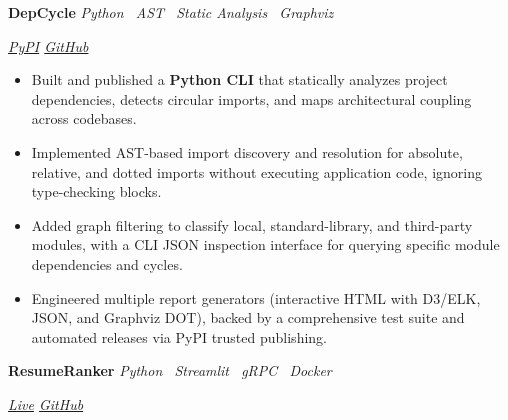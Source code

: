 \documentclass[10pt,a4paper]{article}
\newcommand{\projectentry}[3]{%
    \noindent
    \begin{minipage}[t]{0.66\linewidth}
        \raggedright
        \textbf{#1}
        \hspace{0.7em}
        \textit{\color{textgray}#2}
    \end{minipage}%
    \hfill
    \begin{minipage}[t]{0.30\linewidth}
        \raggedleft
        \itshape\color{textgray}#3
    \end{minipage}%
    \par
}
\begin{document}
\vspace{2pt}

\projectentry
    {DepCycle}
    {Python \textperiodcentered\ AST \textperiodcentered\ Static Analysis \textperiodcentered\ Graphviz}
    {\href{https://pypi.org/project/depcycle/}{PyPI}
    \quad
    \href{https://github.com/Matricess/depcycle}{GitHub}}

\vspace{1pt}

\begin{itemize}

    \item Built and published a \textbf{Python CLI} that statically analyzes project dependencies, detects circular imports, and maps architectural coupling across codebases.

    \item Implemented AST-based import discovery and resolution for absolute, relative, and dotted imports without executing application code, ignoring type-checking blocks.

    \item Added graph filtering to classify local, standard-library, and third-party modules, with a CLI JSON inspection interface for querying specific module dependencies and cycles.

    \item Engineered multiple report generators (interactive HTML with D3/ELK, JSON, and Graphviz DOT), backed by a comprehensive test suite and automated releases via PyPI trusted publishing.

\end{itemize}

\projectentry
    {ResumeRanker}
    {Python \textperiodcentered\ Streamlit \textperiodcentered\ gRPC \textperiodcentered\ Docker}
    {\href{https://resumeranker.kishanthanki.space/}{Live}
    \quad
    \href{https://github.com/Kishan-Thanki/ResumeRanker}{GitHub}}

\vspace{1pt}
\end{document}

